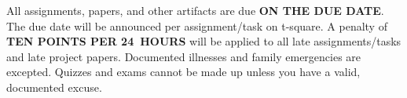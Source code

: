         All assignments, papers, and other artifacts are due \textbf{ON THE DUE DATE}. The due date will be announced per assignment/task on t-square. A penalty of \textbf{TEN POINTS PER 24~HOURS} will be applied to all late assignments/tasks and late project papers. Documented illnesses and family emergencies are excepted. Quizzes and exams cannot be made up unless you have a valid, documented excuse.
